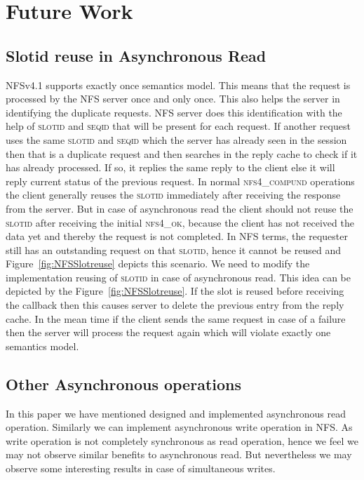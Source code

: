\section{Future Work}
\subsection{Slotid reuse in Asynchronous Read}

NFSv4.1 supports exactly once semantics model. This means that the request is processed by the NFS server once and only once. This also helps the server in identifying the duplicate requests. NFS server does this identification with the help of \textsc{slotid} and \textsc{seqid} that will be present for each request. If another request uses the same \textsc{slotid} and \textsc{seqid} which the server has already seen in the session then that is a duplicate request and then searches in the reply cache to check if it has already processed. If so, it replies the same reply to the client else it will reply current status of the previous request. In normal \textsc{nfs4\_compund} operations the client generally reuses the \textsc{slotid} immediately after receiving the response from the server. But in case of asynchronous read the client should not reuse the \textsc{slotid} after receiving the initial \textsc{nfs4\_ok}, because the client has not received the data yet and thereby the request is not completed. In NFS terms, the requester still has an outstanding request on that \textsc{slotid}, hence it cannot be reused and Figure~\ref{fig:NFSSlotreuse} depicts this scenario. We need to modify the implementation reusing of \textsc{slotid} in case of asynchronous read. This idea can be depicted by the Figure~\ref{fig:NFSSlotreuse}. If the slot is reused before receiving the callback then this causes server to delete the previous entry from the reply cache. In the mean time if the client sends the same request in case of a failure then the server will process the request again which will violate exactly one semantics model.
	
\subsection{Other Asynchronous operations}

	In this paper we have mentioned designed and implemented asynchronous read operation. Similarly we can implement asynchronous write operation in NFS. As write operation is not completely synchronous as read operation, hence we feel we may not observe similar benefits to asynchronous read. But nevertheless we may observe some interesting results in case of simultaneous writes. 
	
